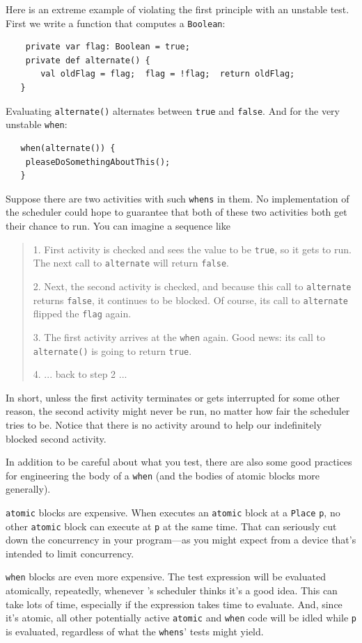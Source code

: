 Here is an extreme example of violating the first principle with an unstable
test.  First we write a function that computes a {\tt Boolean}:
\begin{verbatim}
    private var flag: Boolean = true;
    private def alternate() {
       val oldFlag = flag;  flag = !flag;  return oldFlag;
   }
\end{verbatim}
Evaluating {\tt alternate()} alternates between {\tt true} and {\tt false}.
And for the very unstable {\tt when}:
\begin{verbatim}
   when(alternate()) {
   	pleaseDoSomethingAboutThis();
   }
\end{verbatim}
Suppose there are two activities with such {\tt whens} in them.
No implementation of the \Xten{} scheduler could hope to guarantee that
both of these two activities both get their chance to run.  You can imagine
a sequence like
\begin{quote}
1. First activity is checked and sees the value to be {\tt true}, so it gets to run.
The next call to {\tt alternate} will return {\tt false}.

2. Next, the second activity is checked, and because this call to 
{\tt alternate} returns {\tt false}, it continues to be
blocked. Of course, its call to {\tt alternate} flipped the {\tt flag} again.

3.  The first activity arrives at the {\tt when} again.  Good news: its
call to {\tt alternate()} is going to return {\tt true}.

4. ...  back to step 2 ...
\end{quote}

In short, unless the first activity terminates or gets interrupted for some other
reason, the second activity might never be run, no matter how fair the 
scheduler tries to be.  Notice that there is no activity around to help our
indefinitely blocked second activity.

In addition to be careful about what you test, there are also some good practices
for engineering the body of a {\tt when} (and
the bodies of atomic blocks more generally).

{\tt atomic} blocks are expensive. When \Xten{} executes an {\tt atomic} block at a
{\tt Place} {\tt p}, no other {\tt atomic} block can execute at {\tt p} at the same
time. That can seriously cut down the concurrency in your program---as you
might expect from a device that's intended to limit concurrency.

{\tt when} blocks are even more expensive. The test expression will be
evaluated atomically, repeatedly, whenever \Xten{}'s scheduler thinks it's a good
idea. This can take lots of time, especially if the expression takes time to evaluate.
And, since it's atomic, all other potentially active {\tt atomic} and 
{\tt when} code will be idled
while {\tt p} is evaluated, regardless of what the {\tt whens}' tests might yield. 

